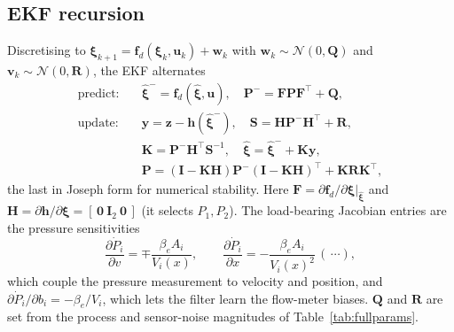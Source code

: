 \subsection{EKF recursion}
Discretising to $\boldsymbol\xi_{k+1}=\mathbf f_d(\boldsymbol\xi_k,\mathbf u_k)+\mathbf w_k$
with $\mathbf w_k\!\sim\!\mathcal N(0,\mathbf Q)$ and $\mathbf v_k\!\sim\!\mathcal N(0,\mathbf R)$,
the EKF alternates
\begin{align}
\text{predict:}\quad & \hat{\boldsymbol\xi}^- = \mathbf f_d(\hat{\boldsymbol\xi},\mathbf u), \quad
\mathbf P^- = \mathbf F\mathbf P\mathbf F^{\!\top} + \mathbf Q, \\
\text{update:}\quad & \mathbf y = \mathbf z - \mathbf h(\hat{\boldsymbol\xi}^-), \quad
\mathbf S = \mathbf H\mathbf P^-\mathbf H^{\!\top} + \mathbf R, \\
& \mathbf K = \mathbf P^-\mathbf H^{\!\top}\mathbf S^{-1}, \quad
\hat{\boldsymbol\xi} = \hat{\boldsymbol\xi}^- + \mathbf K\mathbf y, \\
& \mathbf P = (\mathbf I-\mathbf K\mathbf H)\mathbf P^-(\mathbf I-\mathbf K\mathbf H)^{\!\top}
            + \mathbf K\mathbf R\mathbf K^{\!\top},
\end{align}
the last in Joseph form for numerical stability. Here
$\mathbf F=\partial\mathbf f_d/\partial\boldsymbol\xi|_{\hat{\boldsymbol\xi}}$ and
$\mathbf H=\partial\mathbf h/\partial\boldsymbol\xi=[\,\mathbf 0\ \mathbf I_2\ \mathbf 0\,]$
(it selects $P_1,P_2$). The load-bearing Jacobian entries are the pressure
sensitivities
\begin{equation}
\frac{\partial \dot P_i}{\partial v} = \mp\frac{\beta_e A_i}{V_i(x)}, \qquad
\frac{\partial \dot P_i}{\partial x} = -\frac{\beta_e A_i}{V_i(x)^2}\,(\,\cdots),
\end{equation}
which couple the pressure measurement to velocity and position, and
$\partial\dot P_i/\partial b_i=-\beta_e/V_i$, which lets the filter learn the
flow-meter biases. $\mathbf Q$ and $\mathbf R$ are set from the process and
sensor-noise magnitudes of Table~\ref{tab:fullparams}.

